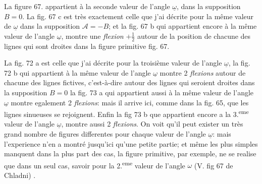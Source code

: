 \documentclass[11pt,a4paper]{article}
\begin{document}

La figure 67. appartient à la seconde valeur de l'angle $\underline{\omega}$, dans
la supposition $B=0$. La fig. 67 c est très exactement celle que
j'ai décrite pour la même valeur de $\underline{\omega}$ dans la supposition
$\mathcal{A} = -B$; et la fig. 67 b qui appartient encore à la même valeur
de l'angle $\underline{\omega}$, montre une \emph{flexion} $+\frac{1}{2}$ autour de la position
de chacune des lignes qui sont droites dans la figure primitive
fig. 67.

La fig. 72 a est celle que j'ai décrite pour la troisième valeur de
l'angle $\underline{\omega}$, la fig. 72 b qui appartient à la même valeur de l'angle
$\underline{\omega}$ montre 2 \emph{flexions} autour de chacune des lignes fictives, c'est-à-dire
autour des lignes qui seroient droites dans la supposition $B=0$
la fig. 73 a qui appartient aussi à la même valeur de l'angle $\underline{\omega}$
montre egalement 2 \emph{flexions}: mais il arrive ici, comme dans la
fig. 65, que les lignes sinueuses se rejoignent.  Enfin la fig 73 b que
appartient encore a la 3.\textsuperscript{eme} valeur de l'angle $\underline{\omega}$, montre
aussi 2 \emph{flexions}. On voit qu'il peut exister un très grand
nombre de figures differentes pour chaque valeur de l'angle $\underline{\omega}$:
mais l'experience n'en a montré jusqu'ici qu'une petite partie; et
 même les plus simples manquent dans la plus part des
cas,   
 la figure primitive, par exemple, ne se realise que dans
un seul  cas,  savoir pour la 2.\textsuperscript{eme} valeur de l'angle $\omega$
(V. fig 67 de Chladni)
  
.
\end{document}
